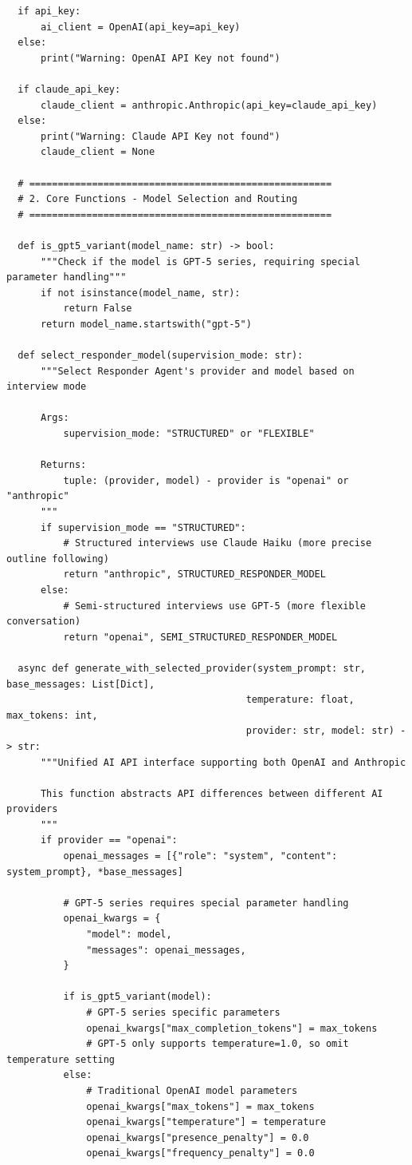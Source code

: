 \documentclass[sigchi,nonacm,manuscript]{acmart}
\begin{document}
\begin{lstlisting}
  if api_key:
      ai_client = OpenAI(api_key=api_key)
  else:
      print("Warning: OpenAI API Key not found")

  if claude_api_key:
      claude_client = anthropic.Anthropic(api_key=claude_api_key)
  else:
      print("Warning: Claude API Key not found")
      claude_client = None

  # =====================================================
  # 2. Core Functions - Model Selection and Routing
  # =====================================================

  def is_gpt5_variant(model_name: str) -> bool:
      """Check if the model is GPT-5 series, requiring special parameter handling"""
      if not isinstance(model_name, str):
          return False
      return model_name.startswith("gpt-5")

  def select_responder_model(supervision_mode: str):
      """Select Responder Agent's provider and model based on interview mode
      
      Args:
          supervision_mode: "STRUCTURED" or "FLEXIBLE"
      
      Returns:
          tuple: (provider, model) - provider is "openai" or "anthropic"
      """
      if supervision_mode == "STRUCTURED":
          # Structured interviews use Claude Haiku (more precise outline following)
          return "anthropic", STRUCTURED_RESPONDER_MODEL
      else:
          # Semi-structured interviews use GPT-5 (more flexible conversation)
          return "openai", SEMI_STRUCTURED_RESPONDER_MODEL

  async def generate_with_selected_provider(system_prompt: str, base_messages: List[Dict], 
                                          temperature: float, max_tokens: int, 
                                          provider: str, model: str) -> str:
      """Unified AI API interface supporting both OpenAI and Anthropic
      
      This function abstracts API differences between different AI providers
      """
      if provider == "openai":
          openai_messages = [{"role": "system", "content": system_prompt}, *base_messages]
          
          # GPT-5 series requires special parameter handling
          openai_kwargs = {
              "model": model,
              "messages": openai_messages,
          }
          
          if is_gpt5_variant(model):
              # GPT-5 series specific parameters
              openai_kwargs["max_completion_tokens"] = max_tokens
              # GPT-5 only supports temperature=1.0, so omit temperature setting
          else:
              # Traditional OpenAI model parameters
              openai_kwargs["max_tokens"] = max_tokens
              openai_kwargs["temperature"] = temperature
              openai_kwargs["presence_penalty"] = 0.0
              openai_kwargs["frequency_penalty"] = 0.0
              

\end{lstlisting}
\end{document}
